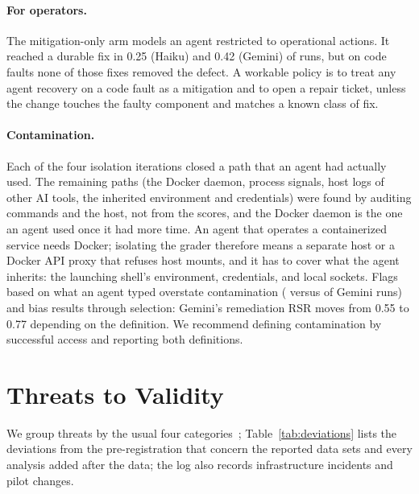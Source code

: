 \paragraph{For operators.} The mitigation-only arm models an agent restricted to operational actions. It reached a durable
fix in 0.25 (Haiku) and 0.42 (Gemini) of runs, but on code faults none of those fixes removed the defect. A workable policy
is to treat any agent recovery on a code fault as a mitigation and to open a repair ticket, unless the change touches the
faulty component and matches a known class of fix.

\paragraph{Contamination.} Each of the four isolation iterations closed a path that an agent had actually used. The
remaining paths (the Docker daemon, process signals, host logs of other AI tools, the inherited environment and
credentials) were found by auditing commands and the
host, not from the scores, and the Docker daemon is the one an agent used once it had more time. An agent that operates
a containerized service needs Docker; isolating the grader therefore means a separate host or a Docker API proxy that
refuses host mounts, and it has to cover what the agent inherits: the launching shell's environment, credentials, and
local sockets. Flags based on what an agent typed overstate contamination (\numpeekStringGemini{} versus \numpeekGemini{} of
\numairunsGemini{} Gemini runs) and bias results through selection: Gemini's remediation RSR moves from 0.55 to 0.77
depending on the definition. We recommend defining contamination by successful access and reporting both definitions.

\section{Threats to Validity}\label{sec:threats}

We group threats by the usual four categories~\citep{wohlin2012experimentation}; Table~\ref{tab:deviations} lists the
deviations from the pre-registration that concern the reported data sets and every analysis added after the data;
the log also records infrastructure incidents and pilot changes.

